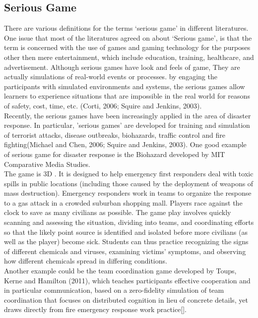 \subsection{Serious Game}

There are various definitions for the terms `serious game' in different literatures. One issue that most of the literatures agreed on about `Serious game', is that the term is concerned with the use of games and gaming technology for the purposes other then mere entertainment, which include education, training, healthcare, and advertisement. Although serious games have look and feels of game, They are actually simulations of real-world events or processes. by engaging the participants with simulated environments and systems, the serious games allow learners to experience situations that are impossible in the real world for reasons of safety, cost, time, etc. (Corti, 2006; Squire and Jenkins, 2003). \\

Recently, the serious games have been increasingly applied in the area of disaster response. In particular, 'serious games' are developed for training and simulation of terrorist attacks, disease outbreaks, biohazards, traffic control and fire fighting(Michael and Chen, 2006; Squire and Jenkins, 2003). One good example of serious game for disaster response is the Biohazard developed by MIT Comparative Media Studies.\\


The game is 3D . It is designed to help emergency first responders deal with toxic spills in public locations (including those caused by the deployment of weapons of mass destruction). Emergency responders work in teams to organize the response to a gas attack in a crowded suburban shopping mall. Players race against the clock to save as many civilians as possible. The game play involves quickly scanning and assessing the situation, dividing into teams, and coordinating efforts so that the likely point source is identified and isolated before more civilians (as well as the player) become sick. Students can thus practice recognizing the signs of different chemicals and viruses, examining victims' symptoms, and observing how different chemicals spread in differing conditions.\\

Another example could be the team coordination game developed by Toups, Kerne and Hamilton (2011), which teaches participants effective cooperation and in particular communication, based on a zero-fidelity simulation of team coordination that focuses on distributed cognition in lieu of concrete details, yet draws directly from fire emergency response work practice[].\\

